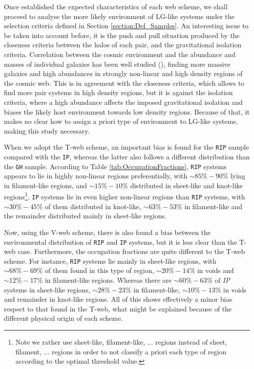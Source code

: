 \documentclass[a4,useAMS,usenatbib,usegraphicx]{latex/mn2e}
\begin{document}
Once established the expected characteristics of each web scheme, we shall 
proceed to analyse the more likely environment of LG-like systems under 
the selection criteria defined in Section \ref{section:Def_Samples}. An
interesting issue to be taken into account before, it is the push and pull
situation produced by the closeness criteria between the halos of each 
pair, and the gravitational isolation criteria. Correlation between the 
cosmic environment and the abundance and masses of individual galaxies has 
been well studied (), finding more massive 
galaxies and high abundances in strongly non-linear and high density 
regions of the cosmic web. This is in agreement with the closeness 
criteria, which allows to find more pair systems in high density regions, 
but it is against the isolation criteria, where a high abundance affects
the imposed gravitational isolation and biases the likely host environment
towards low density regions. Because of that, it makes no clear 
how to assign a priori type of environment to LG-like systems, making this 
study necessary.



When we adopt the T-web scheme, an important bias is found for the 
\texttt{RIP} sample compared with the \texttt{IP}, whereas the latter 
also follows a different distribution than the \texttt{GH} sample. 
According to Table \ref{tab:OccupationFractions}, \texttt{RIP} systems 
appears to lie in highly non-linear regions preferentially, with $\sim 85\%
-90\%$ lying in filament-like regions, and $\sim 15\%-10\%$ distributed in 
sheet-like and knot-like regions\footnote{Note we rather use sheet-like, 
filament-like, ... regions instead of sheet, filament, ... regions in 
order to not classify a priori each type of region according to the 
optimal threshold value.}. \texttt{IP} systems lie in even higher 
non-linear regions than \texttt{RIP} systems, with $\sim 30\% - 45\%$ of 
them distributed in knot-like, $\sim 63\% - 53\%$ in filament-like and the 
remainder distributed mainly in sheet-like regions.



Now, using the V-web scheme, there is also found a bias between the 
environmental distribution of \texttt{RIP} and \texttt{IP} systems, but it 
is less clear than the T-web case. Furthermore, the occupation fractions 
are quite different to the T-web scheme. For instance, \texttt{RIP} 
systems lie mainly in sheet-like regions, with $\sim 68\% - 69\%$ of them 
found in this type of region, $\sim 20\% - 14\%$ in voids and $\sim 12\% - 
17\%$ in filament-like regions. Whereas there are $\sim 60\% - 63\%$ of
\textit{IP} systems in sheet-like regions, $\sim 28\% - 23\%$ in 
filament-like, $\sim 10\% - 13\%$ in voids and remainder in knot-like
regions. All of this shows effectively a minor bias respect to that found
in the T-web, what might be explained because of the different physical 
origin of each scheme.
\end{document}
